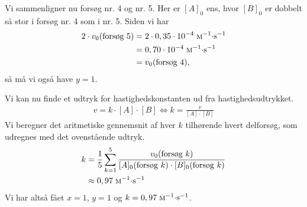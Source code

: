 \documentclass{report}
\begin{document}
Vi sammenligner nu forsøg nr. 4 og nr. 5.
Her er $[A]_0$ ens, hvor $[B]_0$ er dobbelt så stor i forsøg nr. 4 som i nr. 5.
Siden vi har
\begin{equation*}
\begin{split}
  2 \cdot v_0(\text{forsøg 5})&= 2 \cdot 0,35 \cdot 10 ^{-4} \;\unit{\textsc{m}^{-1}\cdot s ^{-1}} \\
  &=0,70\cdot 10 ^{-4} \;\unit{\textsc{m}^{-1}\cdot s ^{-1}}\\
  &= v_0(\text{forsøg 4}),
\end{split}
\end{equation*}
så må vi også have $y=1$.

Vi kan nu finde et udtryk for hastighedskonstanten ud fra hastighedsudtrykket.
\begin{equation*}
\begin{split}
  v=k \cdot [A] \cdot [B] \iff k=\frac{v}{[A]\cdot [B]}
\end{split}
\end{equation*}
Vi beregner det aritmetiske gennemsnit af hver $k$ tilhørende hvert delforsøg, som udregnes med det ovenstående udtryk. 
\begin{equation*}
\begin{split}
  k&=\frac{1}{5} \sum_{k=1}^{5} \frac{v_0(\text{forsøg }k)}{[A]_0(\text{forsøg }k) \cdot [B]_0(\text{forsøg }k)} \\
  &\approx 0,97\;\unit{\textsc{m}^{-1}\cdot s ^{-1}}
\end{split}
\end{equation*}
Vi har altså fået $x=1$, $y=1$ og $k=0,97 \;\unit{\textsc{m}^{-1}\cdot s ^{-1}}$. 
\end{document}

